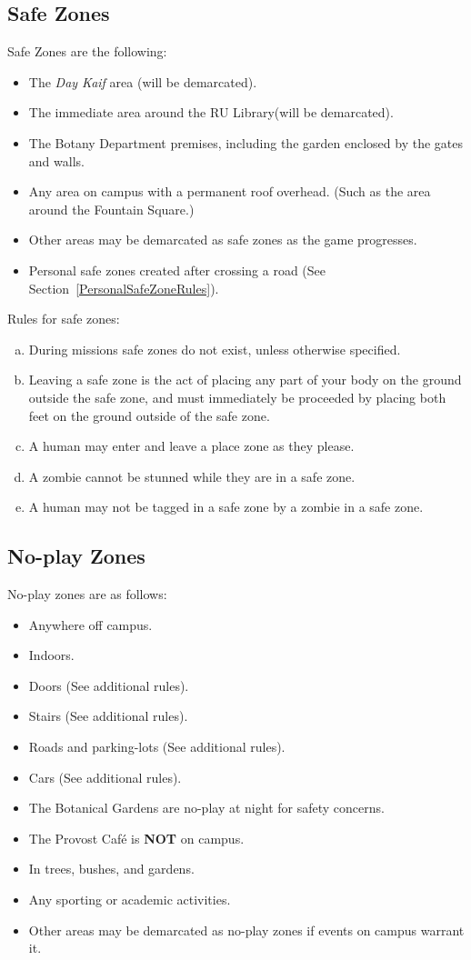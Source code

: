 \documentclass[a4paper,12pt]{article}
\begin{document}
\subsection{Safe Zones}
Safe Zones are the following:
\begin{itemize}
    \item The \emph{Day Kaif} area (will be demarcated).
    \item The immediate area around the RU Library(will be demarcated).
    \item The Botany Department premises, including the garden enclosed by the gates and walls.
    \item Any area on campus with a permanent roof overhead. (Such as the area around the Fountain Square.)
    \item Other areas may be demarcated as safe zones as the game progresses.
    \item Personal safe zones created after crossing a road (See Section~\ref{PersonalSafeZoneRules}).
\end{itemize}

Rules for safe zones:
\begin{enumerate}[(a)]
    \item During missions safe zones do not exist, unless otherwise specified.
    \item Leaving a safe zone is the act of placing any part of your body on the ground outside the safe zone, and must immediately be proceeded by placing both feet on the ground outside of the safe zone.
    \item A human may enter and leave a place zone as they please.
    \item A zombie cannot be stunned while they are in a safe zone.
    \item A human may not be tagged in a safe zone by a zombie in a safe zone.
\end{enumerate}

\subsection{No-play Zones}
No-play zones are as follows:
\begin{itemize}
    \item Anywhere off campus.
    \item Indoors.
    \item Doors (See additional rules).
    \item Stairs (See additional rules).
    \item Roads and parking-lots (See additional rules).
    \item Cars (See additional rules).
    \item The Botanical Gardens are no-play at night for safety concerns.
    \item The Provost Caf\'e is {\bf NOT} on campus. 
    \item In trees, bushes, and gardens.
    \item Any sporting or academic activities.
    \item Other areas may be demarcated as no-play zones if events on campus warrant it.
\end{itemize}
\end{document}
